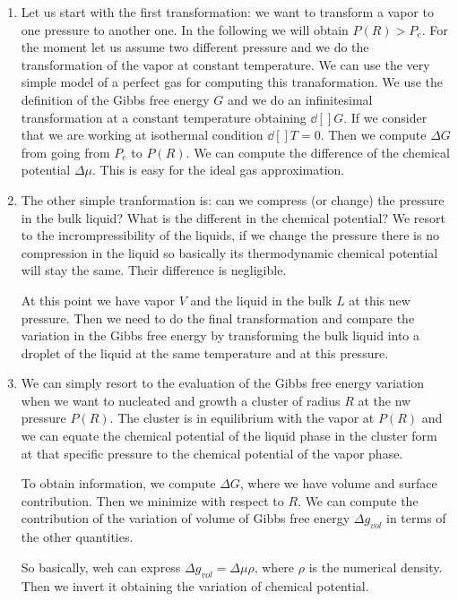 \documentclass[../main/main.tex]{subfiles}
\begin{document}
\begin{enumerate}
\item Let us start with the first transformation: we want to transform a vapor to one pressure to another one. In the following we will obtain \( P(R)>P_e \). For the moment let us assume two different pressure and we do the transformation of the vapor at constant temperature. We can use the very simple model of a perfect gas for computing this tranaformation. We use the definition of the Gibbs free energy \( G \) and we do an infinitesimal transformation at a constant temperature obtaining \( \dd[]{G}  \).
If we consider that we are working at isothermal condition \( \dd[]{T}=0  \). Then we compute \( \Delta G \) from going from \( P_e \) to \( P(R) \).
We can compute the difference of the chemical potential \( \Delta \mu  \). This is easy for the ideal gas approximation.
\item The other simple tranformation is: can we compress (or change) the pressure in the bulk liquid? What is the different in the chemical potential? We resort to the incrompressibility of the liquids, if we change the pressure there is no compression in the liquid so basically its thermodynamic chemical potential will stay the same. Their difference is negligible.

At this point we have vapor \( V \) and the liquid in the bulk \( L \) at this new pressure. Then we need to do the final transformation and compare the variation in the Gibbs free energy by transforming the bulk liquid into a droplet of the liquid at the same temperature and at this pressure.

\item  We can simply resort to the evaluation of the Gibbs free energy variation when we want to nucleated and growth a cluster of radius \( R \) at the nw pressure \( P(R) \). The cluster is in equilibrium with the vapor at \( P(R) \) and we can equate the chemical potential of the liquid phase in the cluster form at that specific pressure to the chemical potential of the vapor phase.

To obtain information, we compute \( \Delta G \), where we have volume and surface contribution. Then we minimize with respect to \( R \). We can compute the contribution of the variation of volume of Gibbs free energy \( \Delta g_{vol} \) in terms of the other quantities.

So basically, weh can express \( \Delta g_{vol} = \Delta \mu \rho  \), where \( \rho  \) is the numerical density. Then we invert it obtaining the variation of chemical potential.

\end{enumerate}
\end{document}
